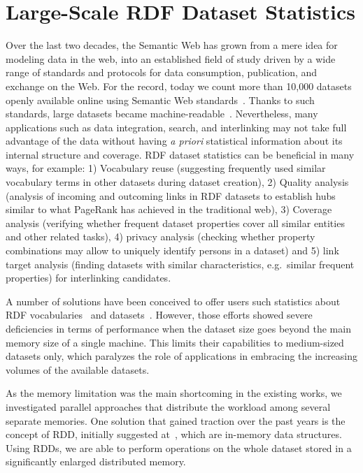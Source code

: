 \chapter{Large-Scale RDF Dataset Statistics}
\label{chapter:dist_lod_stats}

Over the last two decades, the Semantic Web has grown from a mere idea for modeling data in the web, into an established field of study driven by a wide range of standards and protocols for data consumption, publication, and exchange on the Web.
For the record, today we count more than 10,000 datasets openly available online using Semantic Web standards~.
Thanks to such standards, large datasets became machine-readable~\cite{rw2014}.
Nevertheless, many applications such as data integration, search, and interlinking may not take full advantage of the data without having \textit{a priori} statistical information about its internal structure and coverage. 
\gls{RDF} dataset statistics can be beneficial in many ways, for example: 1) Vocabulary reuse (suggesting frequently used similar vocabulary terms in other datasets during dataset creation), 2) Quality analysis (analysis of incoming and outcoming links in \gls{RDF} datasets to establish hubs similar to what PageRank has achieved in the traditional web), 3) Coverage analysis (verifying whether frequent dataset properties cover all similar entities and other related tasks), 4) privacy analysis (checking whether property combinations may allow to uniquely identify persons in a dataset) and 5) link target analysis (finding datasets with similar characteristics, e.g.~similar frequent properties) for interlinking candidates.

A number of solutions have been conceived to offer users such statistics about \gls{RDF} vocabularies~\cite{vandenbussche2015linked} and datasets~\cite{conf/dexaw/LangeggerW09,ermilov-2013-kesw}.
However, those efforts showed severe deficiencies in terms of performance when the dataset size goes beyond the main memory size of a single machine.
This limits their capabilities to medium-sized datasets only, which paralyzes the role of applications in embracing the increasing volumes of the available datasets.

As the memory limitation was the main shortcoming in the existing works, we investigated parallel approaches that distribute the workload among several separate memories.
One solution that gained traction over the past years is the concept of \gls{RDD}, initially suggested at~\cite{zaharia2012resilient}, which are in-memory data structures. 
Using \gls{RDD}s, we are able to perform operations on the whole dataset stored in a significantly enlarged distributed memory.

